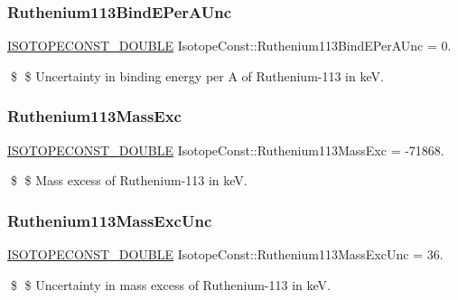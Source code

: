 \subsubsection{\texorpdfstring{Ruthenium113\+Bind\+E\+Per\+A\+Unc}{Ruthenium113BindEPerAUnc}}
{\footnotesize\ttfamily \mbox{\hyperlink{group___isotope_const-_macros_ga8f45a7272ce02c0b4c65c44636ed719a}{I\+S\+O\+T\+O\+P\+E\+C\+O\+N\+S\+T\+\_\+\+D\+O\+U\+B\+LE}} Isotope\+Const\+::\+Ruthenium113\+Bind\+E\+Per\+A\+Unc = 0.}

\$ \$ Uncertainty in binding energy per A of Ruthenium-\/113 in keV. \mbox{\label{group___isotope_const-_ruthenium-_ru113_ga0fed438294290ee64b7eeeaf8a6a7830}} 
\subsubsection{\texorpdfstring{Ruthenium113\+Mass\+Exc}{Ruthenium113MassExc}}
{\footnotesize\ttfamily \mbox{\hyperlink{group___isotope_const-_macros_ga8f45a7272ce02c0b4c65c44636ed719a}{I\+S\+O\+T\+O\+P\+E\+C\+O\+N\+S\+T\+\_\+\+D\+O\+U\+B\+LE}} Isotope\+Const\+::\+Ruthenium113\+Mass\+Exc = -\/71868.}

\$ \$ Mass excess of Ruthenium-\/113 in keV. \mbox{\label{group___isotope_const-_ruthenium-_ru113_gaf9054a3c204842934109398df366b270}} 
\subsubsection{\texorpdfstring{Ruthenium113\+Mass\+Exc\+Unc}{Ruthenium113MassExcUnc}}
{\footnotesize\ttfamily \mbox{\hyperlink{group___isotope_const-_macros_ga8f45a7272ce02c0b4c65c44636ed719a}{I\+S\+O\+T\+O\+P\+E\+C\+O\+N\+S\+T\+\_\+\+D\+O\+U\+B\+LE}} Isotope\+Const\+::\+Ruthenium113\+Mass\+Exc\+Unc = 36.}

\$ \$ Uncertainty in mass excess of Ruthenium-\/113 in keV. \mbox{\label{group___isotope_const-_ruthenium-_ru113_ga9d2653c7df7a1943b6a2bfdf19edd8d3}} 
